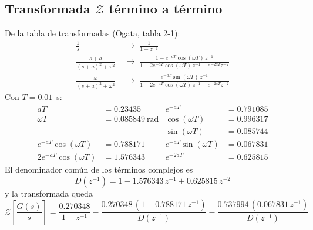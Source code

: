 \documentclass[11pt,letterpaper]{article}
\begin{document}
\subsection{Transformada $\mathcal{Z}$ término a término}
De la tabla de transformadas (Ogata, tabla 2-1):
\begin{align}
  \frac{1}{s} &\;\longrightarrow\; \frac{1}{1-z^{-1}}\\
  \frac{s+a}{(s+a)^2+\omega^2} &\;\longrightarrow\;
     \frac{1 - e^{-aT}\cos(\omega T)\,z^{-1}}
          {1 - 2e^{-aT}\cos(\omega T)\,z^{-1} + e^{-2aT}z^{-2}}\\
  \frac{\omega}{(s+a)^2+\omega^2} &\;\longrightarrow\;
     \frac{e^{-aT}\sin(\omega T)\,z^{-1}}
          {1 - 2e^{-aT}\cos(\omega T)\,z^{-1} + e^{-2aT}z^{-2}}
\end{align}
Con $T = 0.01$~s:
\begin{align}
  aT &= 0.23435 & e^{-aT} &= 0.791085\\
  \omega T &= 0.085849~\text{rad} & \cos(\omega T) &= 0.996317\\
  & & \sin(\omega T) &= 0.085744\\
  e^{-aT}\cos(\omega T) &= 0.788171 & e^{-aT}\sin(\omega T) &= 0.067831\\
  2e^{-aT}\cos(\omega T) &= 1.576343 & e^{-2aT} &= 0.625815
\end{align}
El denominador común de los términos complejos es
\begin{equation}
  D(z^{-1}) = 1 - 1.576343\,z^{-1} + 0.625815\,z^{-2}
\end{equation}
y la transformada queda
\begin{equation}
  \mathcal{Z}\!\left[\frac{G(s)}{s}\right] =
  \frac{0.270348}{1-z^{-1}}
  - \frac{0.270348\,(1 - 0.788171\,z^{-1})}{D(z^{-1})}
  - \frac{0.737994\,(0.067831\,z^{-1})}{D(z^{-1})}
\end{equation}
\end{document}
